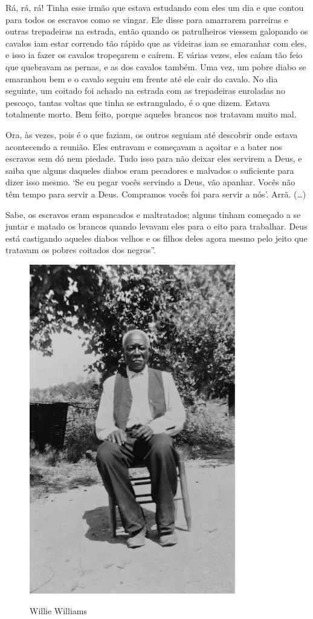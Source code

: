 Rá, rá, rá! Tinha esse irmão que estava estudando com eles um dia e que
contou para todos os escravos como se vingar. Ele disse para amarrarem
parreiras e outras trepadeiras na estrada, então quando os patrulheiros
viessem galopando os cavalos iam estar correndo tão rápido que as
videiras iam se emaranhar com eles, e isso ia fazer os cavalos
tropeçarem e caírem. E várias vezes, eles caíam tão feio que quebravam
as pernas, e as dos cavalos também. Uma vez, um pobre diabo se emaranhou
bem e o cavalo seguiu em frente até ele cair do cavalo. No dia seguinte,
um coitado foi achado na estrada com as trepadeiras enroladas no
pescoço, tantas voltas que tinha se estrangulado, é o que dizem. Estava
totalmente morto. Bem feito, porque aqueles brancos nos tratavam muito
mal.

Ora, às vezes, pois é o que faziam, os outros seguiam até descobrir onde
estava acontecendo a reunião. Eles entravam e começavam a açoitar e a
bater nos escravos sem dó nem piedade. Tudo isso para não deixar eles
servirem a Deus, e saiba que alguns daqueles diabos eram pecadores e
malvados o suficiente para dizer isso mesmo. `Se eu pegar vocês servindo
a Deus, vão apanhar. Vocês não têm tempo para servir a Deus. Compramos
vocês foi para servir a nós'. Arrã. (\ldots{})

Sabe, os escravos eram espancados e maltratados; alguns tinham começado
a se juntar e matado os brancos quando levavam eles para o eito para
trabalhar. Deus está castigando aqueles diabos velhos e os filhos deles
agora mesmo pelo jeito que tratavam os pobres coitados dos negros''.

\begin{figure}[]
\centering
 \includegraphics[width=90mm]{./imgs/williewilliams_recorte.jpg} \label{img20}
\caption{Willie Williams}
\end{figure}

